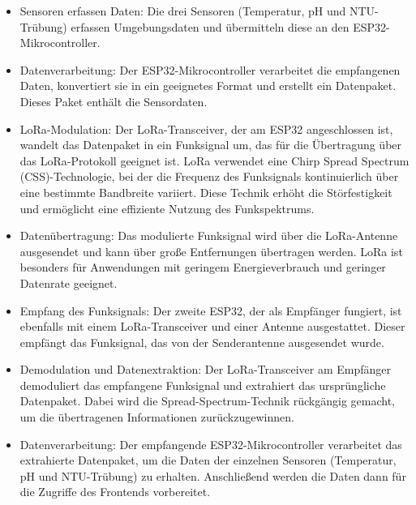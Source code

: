 \begin{itemize}
  \item Sensoren erfassen Daten: Die drei Sensoren (Temperatur, pH und NTU-Trübung) erfassen Umgebungsdaten und übermitteln diese an den ESP32-Mikrocontroller.
  \item Datenverarbeitung: Der ESP32-Mikrocontroller verarbeitet die empfangenen Daten, konvertiert sie in ein geeignetes Format und erstellt ein Datenpaket. Dieses Paket enthält die Sensordaten.
  \item LoRa-Modulation: Der LoRa-Transceiver, der am ESP32 angeschlossen ist, wandelt das Datenpaket in ein Funksignal um, das für die Übertragung über das LoRa-Protokoll geeignet ist. LoRa verwendet eine Chirp Spread Spectrum (CSS)-Technologie, bei der die Frequenz des Funksignals kontinuierlich über eine bestimmte Bandbreite variiert. Diese Technik erhöht die Störfestigkeit und ermöglicht eine effiziente Nutzung des Funkspektrums.
  \item Datenübertragung: Das modulierte Funksignal wird über die LoRa-Antenne ausgesendet und kann über große Entfernungen übertragen werden. LoRa ist besonders für Anwendungen mit geringem Energieverbrauch und geringer Datenrate geeignet.
  \item Empfang des Funksignals: Der zweite ESP32, der als Empfänger fungiert, ist ebenfalls mit einem LoRa-Transceiver und einer Antenne ausgestattet. Dieser empfängt das Funksignal, das von der Senderantenne ausgesendet wurde.
  \item Demodulation und Datenextraktion: Der LoRa-Transceiver am Empfänger demoduliert das empfangene Funksignal und extrahiert das ursprüngliche Datenpaket. Dabei wird die Spread-Spectrum-Technik rückgängig gemacht, um die übertragenen Informationen zurückzugewinnen.
  \newpage
  \item Datenverarbeitung: Der empfangende ESP32-Mikrocontroller verarbeitet das extrahierte Datenpaket, um die Daten der einzelnen Sensoren (Temperatur, pH und NTU-Trübung) zu erhalten. Anschließend werden die Daten dann für die Zugriffe des Frontends vorbereitet.
\end{itemize}
